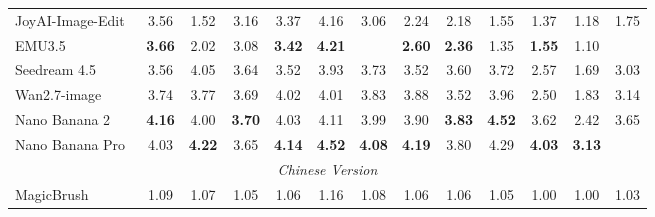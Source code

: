\documentclass{llmxive}
\begin{document}
\begin{table}[t]
{\begin{tabular}{l|cccccc|cccccc}
            JoyAI-Image-Edit~\cite{joyaiimage2026}
            & 3.56& 1.52 & 3.16 & 3.37 & 4.16 & \cellcolor[HTML]{C8C8C8}3.06 & 2.24 & 2.18 & 1.55 & 1.37 & 1.18
            & \cellcolor[HTML]{C8C8C8}1.75 \\

            EMU3.5~\cite{cui2025emu3}
            & \textbf{3.66}  & 2.02 & 3.08 & \textbf{3.42} & \textbf{4.21} & \cellcolor[HTML]{C8C8C8}{\textbf{3.20}} & \textbf{2.60} & \textbf{2.36} & 1.35 & \textbf{1.55} & 1.10
            & \cellcolor[HTML]{C8C8C8}{\textbf{1.86}} \\


            

            \midrule

            Seedream 4.5~\cite{seedream2025seedream}
            & 3.56 & 4.05 & 3.64 & 3.52 & 3.93 & \cellcolor[HTML]{C8C8C8}3.73 & 3.52 & 3.60 & 3.72 & 2.57 & 1.69
            & \cellcolor[HTML]{C8C8C8}3.03 \\

            Wan2.7-image~\cite{nanobananapro}
            & 3.74 & 3.77 & 3.69 & 4.02 & 4.01 & \cellcolor[HTML]{C8C8C8}3.83 & 3.88 & 3.52 & 3.96 & 2.50 & 1.83
            & \cellcolor[HTML]{C8C8C8} 3.14  \\

            Nano Banana 2~\cite{gemini3pro}
            & \textbf{4.16} & 4.00 & \textbf{3.70} & 4.03 & 4.11 & \cellcolor[HTML]{C8C8C8}3.99 & 3.90 & \textbf{3.83} & \textbf{4.52} & 3.62 & 2.42
            & \cellcolor[HTML]{C8C8C8} 3.65  \\

            Nano Banana Pro~\cite{nanobananapro}
            & 4.03 & \textbf{4.22} & 3.65 & \textbf{4.14} & \textbf{4.52} &  \cellcolor[HTML]{C8C8C8}\textbf{4.08} & \textbf{4.19} & 3.80 & 4.29 & \textbf{4.03} & \textbf{3.13}
            & \cellcolor[HTML]{C8C8C8}{\textbf{3.89}} \\

            

            

            \midrule
            \multicolumn{13}{c}{\textit{Chinese Version}} \\
            \midrule

            MagicBrush~\cite{zhang2023magicbrush}
            & 1.09 & 1.07 & 1.05 & 1.06 & 1.16 & \cellcolor[HTML]{C8C8C8}1.08 & 1.06 & 1.06 & 1.05 & 1.00 & 1.00 
            & \cellcolor[HTML]{C8C8C8}1.03 \\


\end{tabular}}
\end{table}
\end{document}
